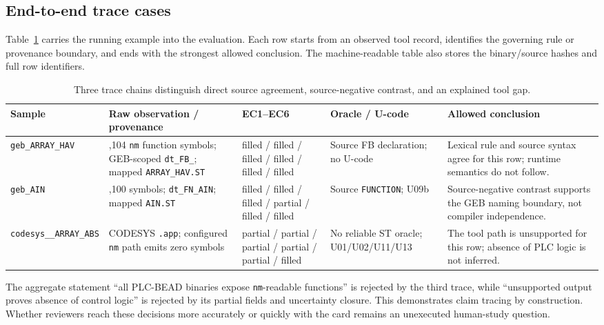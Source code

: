 \documentclass[manuscript,screen,review]{acmart}
\begin{document}
\subsection{End-to-end trace cases}

Table~\ref{tab:trace_cases} carries the running example into the evaluation. Each row starts from an observed tool record, identifies the governing rule or provenance boundary, and ends with the strongest allowed conclusion. The machine-readable table also stores the binary/source hashes and full row identifiers.

\begin{table}[t]
\centering
\scriptsize
\setlength{\tabcolsep}{2.5pt}
\caption{Three trace chains distinguish direct source agreement, source-negative contrast, and an explained tool gap.}
\label{tab:trace_cases}
\begin{tabularx}{0.99\textwidth}{>{\raggedright\arraybackslash}p{}>{\raggedright\arraybackslash}p{}>{\raggedright\arraybackslash}p{}>{\raggedright\arraybackslash}p{}>{\raggedright\arraybackslash}X}
\toprule
Sample & Raw observation / provenance & EC1--EC6 & Oracle / U-code & Allowed conclusion \\
\midrule
\texttt{geb\_\allowbreak ARRAY\_\allowbreak HAV} & 1,104 \texttt{nm} function symbols; GEB-scoped \texttt{dt\_FB\_}; mapped \texttt{ARRAY\_HAV.ST} & filled / filled / filled / filled / filled / filled & Source FB declaration; no U-code & Lexical rule and source syntax agree for this row; runtime semantics do not follow. \\
\texttt{geb\_\allowbreak AIN} & 1,100 symbols; \texttt{dt\_FN\_AIN}; mapped \texttt{AIN.ST} & filled / filled / filled / partial / filled / filled & Source \texttt{FUNCTION}; U09b & Source-negative contrast supports the GEB naming boundary, not compiler independence. \\
\texttt{codesys\_\allowbreak\_ARRAY\_\allowbreak ABS} & CODESYS \texttt{.app}; configured \texttt{nm} path emits zero symbols & partial / partial / partial / partial / partial / filled & No reliable ST oracle; U01/\allowbreak U02/\allowbreak U11/\allowbreak U13 & The tool path is unsupported for this row; absence of PLC logic is not inferred. \\
\bottomrule
\end{tabularx}
\end{table}

The aggregate statement ``all PLC-BEAD binaries expose \texttt{nm}-readable functions'' is rejected by the third trace, while ``unsupported output proves absence of control logic'' is rejected by its partial fields and uncertainty closure. This demonstrates claim tracing by construction. Whether reviewers reach these decisions more accurately or quickly with the card remains an unexecuted human-study question.
\end{document}
